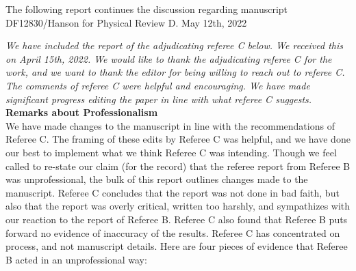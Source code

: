 \documentclass[12pt]{article}
\begin{document}
The following report continues the discussion regarding manuscript DF12830/Hanson for Physical Review D.  May 12th, 2022 \\ \vspace{0.25cm}

\textit{We have included the report of the adjudicating referee C below.  We received this on April 15th, 2022.  We would like to thank the adjudicating referee C for the work, and we want to thank the editor for being willing to reach out to referee C.  The comments of referee C were helpful and encouraging.  We have made significant progress editing the paper in line with what referee C suggests.} \\

\textbf{Remarks about Professionalism} \\ 

We have made changes to the manuscript in line with the recommendations of Referee C.  The framing of these edits by Referee C was helpful, and we have done our best to implement what we think Referee C was intending.  Though we feel called to re-state our claim (for the record) that the referee report from Referee B was unprofessional, the bulk of this report outlines changes made to the manuscript.  Referee C concludes that the report was not done in bad faith, but also that the report was overly critical, written too harshly, and sympathizes with our reaction to the report of Referee B.  Referee C also found that Referee B puts forward no evidence of inaccuracy of the results.  Referee C has concentrated on process, and not manuscript details.  Here are four pieces of evidence that Referee B acted in an unprofessional way:
\end{document}

